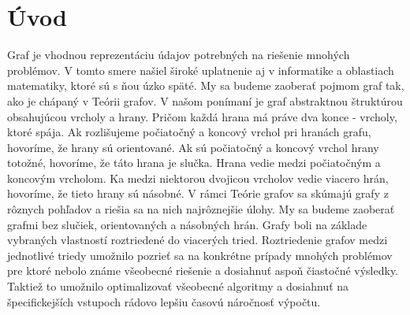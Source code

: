 \chapter{Úvod}
\thispagestyle{empty}
Graf je vhodnou reprezentáciu údajov potrebných na riešenie mnohých problémov.
V tomto smere našiel široké uplatnenie aj v informatike a oblastiach 
matematiky, ktoré sú s ňou úzko späté.
My sa budeme zaoberať pojmom graf tak, ako je chápaný v Teórii grafov.
V našom ponímaní je graf abstraktnou štruktúrou obsahujúcou vrcholy a hrany.
Pričom každá hrana má práve dva konce - vrcholy, ktoré spája. Ak rozlišujeme
počiatočný a koncový vrchol pri hranách grafu, hovoríme, že hrany sú
orientované. Ak sú počiatočný a koncový vrchol hrany totožné, hovoríme, že
táto hrana je slučka. Hrana vedie medzi počiatočným a koncovým vrcholom. Ka
medzi niektorou dvojicou vrcholov vedie viacero hrán, hovoríme, že tieto
hrany sú násobné.
V rámci Teórie grafov sa skúmajú grafy z rôznych pohľadov a riešia sa na 
nich najrôznejšie úlohy. My sa budeme zaoberať grafmi bez slučiek,
orientovaných a násobných hrán.
Grafy boli na základe vybraných vlastností roztriedené do viacerých tried.
Roztriedenie grafov medzi jednotlivé triedy umožnilo 
pozrieť sa na konkrétne prípady mnohých problémov pre ktoré nebolo známe 
všeobecné riešenie a dosiahnuť aspoň čiastočné výsledky. Taktiež to umožnilo 
optimalizovať všeobecné algoritmy a dosiahnuť na špecifickejších vstupoch 
rádovo lepšiu časovú náročnosť výpočtu.


